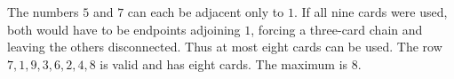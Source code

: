 The numbers $5$ and $7$ can each be adjacent only to $1$. If all nine cards were used, both would have to be endpoints adjoining $1$, forcing a three-card chain and leaving the others disconnected. Thus at most eight cards can be used. The row $7,1,9,3,6,2,4,8$ is valid and has eight cards. The maximum is $\boxed8$.
